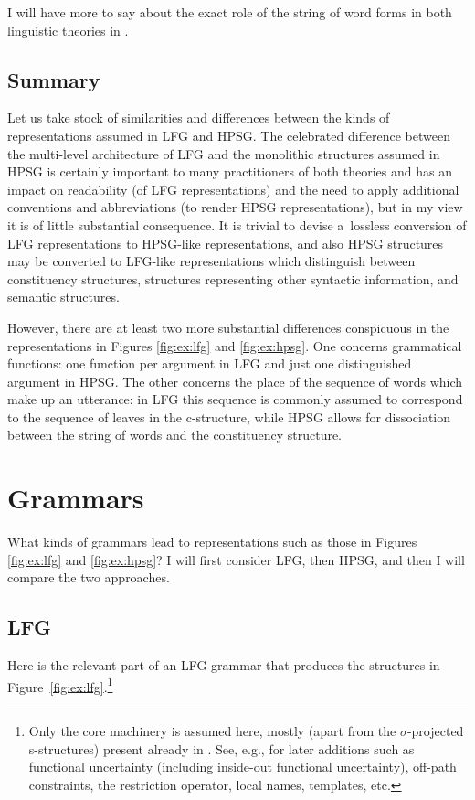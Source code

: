 \documentclass[output=paper,hidelinks]{langscibook}
\begin{document}
I will have more to say about the exact role of the string of word forms in both linguistic theories in .



\subsection{Summary}
\label{sec:arch:sum}

Let us take stock of similarities and differences between the kinds of representations assumed in LFG and HPSG\@.  The celebrated difference between the multi-level architecture of LFG and the monolithic structures assumed in HPSG is certainly important to many practitioners of both theories and has an impact on readability (of LFG representations) and the need to apply additional conventions and abbreviations (to render HPSG representations), but in my view it is of little substantial consequence.  It is trivial to devise a~lossless conversion of LFG representations to HPSG-like representations, and also HPSG structures may be converted to LFG-like representations which distinguish between constituency structures, structures representing other syntactic information, and semantic structures.  

However, there are at least two more substantial differences conspicuous in the representations in Figures \ref{fig:ex:lfg} and \ref{fig:ex:hpsg}.  One concerns grammatical functions: one function per argument in LFG and just one distinguished argument in HPSG\@. The other concerns the place of the sequence of words which make up an utterance: in LFG this sequence is commonly assumed to correspond to the sequence of leaves in the c-structure, while HPSG allows for dissociation between the string of words and the constituency structure.


\section{Grammars}
\label{sec:gram}

What kinds of grammars lead to representations such as those in Figures \ref{fig:ex:lfg} and \ref{fig:ex:hpsg}?  I will first consider LFG, then HPSG, and then I will compare the two approaches.

\subsection{LFG}
\label{sec:gram:lfg}

Here is the relevant part of an LFG grammar that produces the structures in Figure~\ref{fig:ex:lfg}.\footnote{Only the core machinery is assumed here, mostly (apart from the $\sigma$-projected s-structures) present already in \citet{kaplanbresnan82}.  See, e.g., \citet[Chapter {6}]{DLM:LFG} for later additions such as functional uncertainty (including inside-out functional uncertainty), off-path constraints, the restriction operator, local names, templates, etc.}
\end{document}
